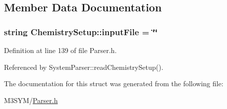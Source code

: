 \subsection{Member Data Documentation}
\hypertarget{structChemistrySetup_a662524c2c7d29c8b83a6016559d256e5}{
\subsubsection[{input\+File}]{\setlength{\rightskip}{0pt plus 5cm}string Chemistry\+Setup\+::input\+File = \char`\"{}\char`\"{}}}\label{structChemistrySetup_a662524c2c7d29c8b83a6016559d256e5}


Definition at line 139 of file Parser.\+h.



Referenced by System\+Parser\+::read\+Chemistry\+Setup().



The documentation for this struct was generated from the following file\+:\begin{DoxyCompactItemize}
\item 
M3\+S\+Y\+M/\hyperlink{Parser_8h}{Parser.\+h}\end{DoxyCompactItemize}
